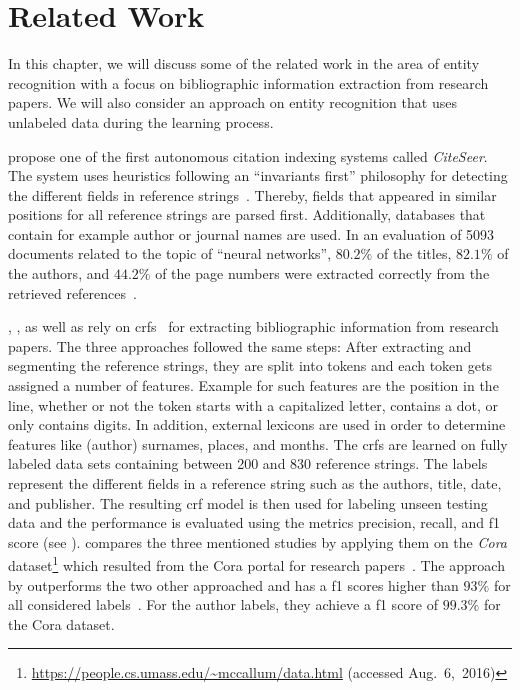 \chapter{Related Work}\label{cha:related-work}
In this chapter, we will discuss some of the related work in the area of entity recognition with a focus on bibliographic information extraction from research papers.
We will also consider an approach on entity recognition that uses unlabeled data during the learning process.

\bigskip

\citet{giles1998citeseer} propose one of the first autonomous citation indexing systems called \emph{CiteSeer}.
The system uses heuristics following an ``invariants first'' philosophy for detecting the different fields in reference strings~\citep{giles1998citeseer}.
Thereby, fields that appeared in similar positions for all reference strings are parsed first.
Additionally, databases that contain for example author or journal names are used.
In an evaluation of \num{5093} documents related to the topic of ``neural networks'', $80.2\%$ of the titles, $82.1\%$ of the authors, and $44.2\%$ of the page numbers were extracted correctly from the retrieved references~\cite{giles1998citeseer}.

\citet{peng2004accurate}, \citet{councill2008parscit}, as well as \citet{groza2012reference} rely on \glspl{crf}~\citep{lafferty2001conditional} for extracting bibliographic information from research papers.
The three approaches followed the same steps:
After extracting and segmenting the reference strings, they are split into tokens and each token gets assigned a number of features.
Example for such features are the position in the line, whether or not the token starts with a capitalized letter, contains a dot, or only contains digits.
In addition, external lexicons are used in order to determine features like (author) surnames, places, and months.
The \glspl{crf} are learned on fully labeled data sets containing between 200 and 830 reference strings.
The labels represent the different fields in a reference string such as the authors, title, date, and publisher.
The resulting \gls{crf} model is then used for labeling unseen testing data and the performance is evaluated using the metrics \gls{precision}, \gls{recall}, and \gls{f1 score} (see ).
\citet{groza2012reference} compares the three mentioned studies by applying them on the \textit{Cora} dataset\footnote{\url{https://people.cs.umass.edu/~mccallum/data.html} (accessed Aug.~6,~2016)} which resulted from the Cora portal for research papers~\citep{mccallum2000automating}.
The approach by \citet{groza2012reference} outperforms the two other approached and has a \glspl{f1 score} higher than $93\%$ for all considered labels~\citep{groza2012reference}.
For the author labels, they achieve a \gls{f1 score} of $99.3\%$ for the Cora dataset.

